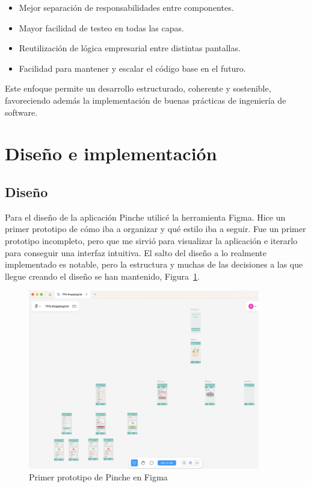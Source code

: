 \begin{itemize}
    \item Mejor separación de responsabilidades entre componentes.
    \item Mayor facilidad de testeo en todas las capas.
    \item Reutilización de lógica empresarial entre distintas pantallas.
    \item Facilidad para mantener y escalar el código base en el futuro.
\end{itemize}

Este enfoque permite un desarrollo estructurado, coherente y sostenible, favoreciendo además la implementación de buenas prácticas de ingeniería de software.

\section{Diseño e implementación}
\label{sec:diseno-implementacion}

\subsection{Diseño}

Para el diseño de la aplicación Pinche utilicé la herramienta Figma. Hice un primer prototipo de cómo iba a organizar y qué estilo iba a seguir. Fue un primer prototipo incompleto, pero que me sirvió para visualizar la aplicación e iterarlo para conseguir una interfaz intuitiva. El salto del diseño a lo realmente implementado es notable, pero la estructura y muchas de las decisiones a las que llegue creando el diseño se han mantenido, Figura~\ref{fig:pincheFigma}.

\begin{figure}[H]
\centering
\includegraphics[width=0.9\textwidth]{./img/description/pinche_figma.png}
\caption{Primer prototipo de Pinche en Figma}
\label{fig:pincheFigma}
\end{figure}

